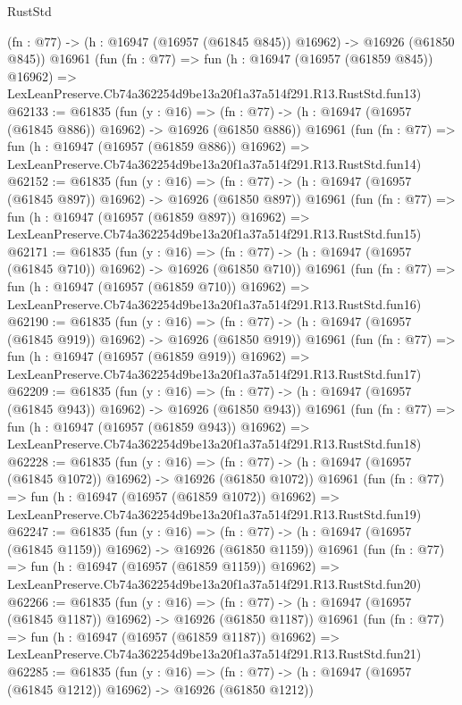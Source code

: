 \begin{lexlean}{RustStd}
\begin{coremodule}
    (fn : @77) -> (h : @16947 (@16957 (@61845 @845)) @16962) -> @16926 (@61850 @845))
    @16961
    (fun (fn : @77) =>
    fun (h : @16947 (@16957 (@61859 @845)) @16962) =>
    LexLeanPreserve.Cb74a362254d9be13a20f1a37a514f291.R13.RustStd.fun13)
@62133 := @61835
    (fun (y : @16) =>
    (fn : @77) -> (h : @16947 (@16957 (@61845 @886)) @16962) -> @16926 (@61850 @886))
    @16961
    (fun (fn : @77) =>
    fun (h : @16947 (@16957 (@61859 @886)) @16962) =>
    LexLeanPreserve.Cb74a362254d9be13a20f1a37a514f291.R13.RustStd.fun14)
@62152 := @61835
    (fun (y : @16) =>
    (fn : @77) -> (h : @16947 (@16957 (@61845 @897)) @16962) -> @16926 (@61850 @897))
    @16961
    (fun (fn : @77) =>
    fun (h : @16947 (@16957 (@61859 @897)) @16962) =>
    LexLeanPreserve.Cb74a362254d9be13a20f1a37a514f291.R13.RustStd.fun15)
@62171 := @61835
    (fun (y : @16) =>
    (fn : @77) -> (h : @16947 (@16957 (@61845 @710)) @16962) -> @16926 (@61850 @710))
    @16961
    (fun (fn : @77) =>
    fun (h : @16947 (@16957 (@61859 @710)) @16962) =>
    LexLeanPreserve.Cb74a362254d9be13a20f1a37a514f291.R13.RustStd.fun16)
@62190 := @61835
    (fun (y : @16) =>
    (fn : @77) -> (h : @16947 (@16957 (@61845 @919)) @16962) -> @16926 (@61850 @919))
    @16961
    (fun (fn : @77) =>
    fun (h : @16947 (@16957 (@61859 @919)) @16962) =>
    LexLeanPreserve.Cb74a362254d9be13a20f1a37a514f291.R13.RustStd.fun17)
@62209 := @61835
    (fun (y : @16) =>
    (fn : @77) -> (h : @16947 (@16957 (@61845 @943)) @16962) -> @16926 (@61850 @943))
    @16961
    (fun (fn : @77) =>
    fun (h : @16947 (@16957 (@61859 @943)) @16962) =>
    LexLeanPreserve.Cb74a362254d9be13a20f1a37a514f291.R13.RustStd.fun18)
@62228 := @61835
    (fun (y : @16) =>
    (fn : @77) -> (h : @16947 (@16957 (@61845 @1072)) @16962) -> @16926 (@61850 @1072))
    @16961
    (fun (fn : @77) =>
    fun (h : @16947 (@16957 (@61859 @1072)) @16962) =>
    LexLeanPreserve.Cb74a362254d9be13a20f1a37a514f291.R13.RustStd.fun19)
@62247 := @61835
    (fun (y : @16) =>
    (fn : @77) -> (h : @16947 (@16957 (@61845 @1159)) @16962) -> @16926 (@61850 @1159))
    @16961
    (fun (fn : @77) =>
    fun (h : @16947 (@16957 (@61859 @1159)) @16962) =>
    LexLeanPreserve.Cb74a362254d9be13a20f1a37a514f291.R13.RustStd.fun20)
@62266 := @61835
    (fun (y : @16) =>
    (fn : @77) -> (h : @16947 (@16957 (@61845 @1187)) @16962) -> @16926 (@61850 @1187))
    @16961
    (fun (fn : @77) =>
    fun (h : @16947 (@16957 (@61859 @1187)) @16962) =>
    LexLeanPreserve.Cb74a362254d9be13a20f1a37a514f291.R13.RustStd.fun21)
@62285 := @61835
    (fun (y : @16) =>
    (fn : @77) -> (h : @16947 (@16957 (@61845 @1212)) @16962) -> @16926 (@61850 @1212))

\end{coremodule}
\end{lexlean}
